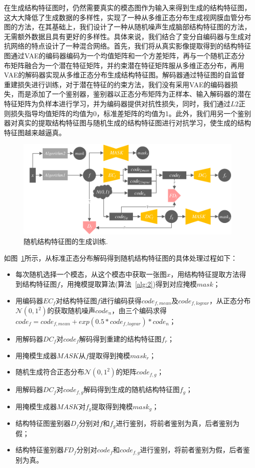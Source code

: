 \documentclass[letterpaper]{article} %
\begin{document}
在生成结构特征图时，\cite{4shin2018medical}仍然需要真实的模态图作为输入来得到生成的结构特征图，这大大降低了生成数据的多样性，\cite{41costa2017towards}实现了一种从多维正态分布生成视网膜血管分布图的方法，在其基础上，我们设计了一种从随机噪声生成脑部结构特征图的方法，无需额外数据且具有更好的多样性。具体来说，我们结合了变分自编码器与生成对抗网络的特点设计了一种混合网络。首先，我们将从真实影像提取得到的结构特征图通过VAE的编码器编码为一个均值矩阵和一个方差矩阵，再与一个随机正态分布矩阵融合为一个潜在特征矩阵，并约束潜在特征矩阵服从多维正态分布，再用VAE的解码器实现从多维正态分布生成结构特征图。解码器通过特征图的自监督重建损失进行训练，对于潜在特征的约束方法，我们没有采用VAE的编码器损失，而是添加了一个鉴别器，鉴别器以正态分布矩阵为正样本、输入解码器的潜在特征矩阵为负样本进行学习，并为编码器提供对抗性损失，同时，我们通过$L2$正则损失指导均值矩阵的均值为0，标准差矩阵的均值为1。此外，我们用另一个鉴别器对真实的提取结构特征图与随机生成的结构特征图进行对抗学习，使生成的结构特征图越来越逼真。
\begin{figure}
	\centering
	\includegraphics[width=0.98\linewidth]{figures/feature_train}
	\caption{随机结构特征图的生成训练.}
	\label{feature_train}
\end{figure}
如图~\ref{feature_train}所示，从标准正态分布解码得到随机结构特征图的具体处理过程如下：
\begin{itemize}
	\item 每次随机选择一个模态，从这个模态中获取一张图$x$，用结构特征提取方法得到结构特征图$f$，用掩模提取算法(算法~\ref{alg:2})得到对应掩模$mask$；
	\item 用编码器$EC_f$对结构特征图$f$进行编码获得$code_{f,mean}$及$code_{f,logvar}$，从正态分布$\mathcal{N}(0,1^2)$的获取随机噪声$code_n$，由三个编码求得$code_f=code_{f,mean}+exp(0.5*code_{f,logvar})*code_n$；
	\item 用解码器$DC_f$对$code_f$解码得到重建的结构特征图$f_r$；
	\item 用掩模生成器$MASK$从$f$提取得到掩模$mask_r$；
	\item 随机生成符合正态分布$\mathcal{N}(0,1^2)$的矩阵$code_{f,g}$；
	\item 用解码器$DC_f$对$code_{f,g}$解码得到生成的随机结构特征图$f_g$；
	\item 用掩模生成器$MASK$对$f_g$提取得到掩模$mask_g$；
	\item 结构特征图鉴别器$D_f$分别对$f$和$f_g$进行鉴别，将前者鉴别为真，后者鉴别为假；
	\item 结构特征鉴别器$FD_f$分别对$code_f$和$code_{f,g}$进行鉴别，将前者鉴别为假，后者鉴别为真。
\end{itemize}
\end{document}
